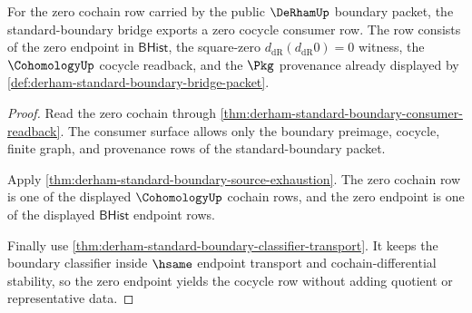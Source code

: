 \begin{theorem}
\label{thm:derham-standard-boundary-zero-cocycle-example}
For the zero cochain row carried by the public $\DeRhamUp$ boundary packet, the
standard-boundary bridge exports a zero cocycle consumer row. The row consists
of the zero endpoint in $\mathsf{BHist}$, the square-zero
$d_{\mathrm{dR}}(d_{\mathrm{dR}}0)=0$ witness, the $\CohomologyUp$ cocycle
readback, and the $\Pkg$ provenance already displayed by
\autoref{def:derham-standard-boundary-bridge-packet}.
\end{theorem}
\begin{proof}
Read the zero cochain through
\autoref{thm:derham-standard-boundary-consumer-readback}. The consumer surface
allows only the boundary preimage, cocycle, finite graph, and provenance rows of
the standard-boundary packet.

Apply \autoref{thm:derham-standard-boundary-source-exhaustion}. The zero
cochain row is one of the displayed $\CohomologyUp$ cochain rows, and the zero
endpoint is one of the displayed $\mathsf{BHist}$ endpoint rows.

Finally use \autoref{thm:derham-standard-boundary-classifier-transport}. It
keeps the boundary classifier inside $\hsame$ endpoint transport and
cochain-differential stability, so the zero endpoint yields the cocycle row
without adding quotient or representative data.
\end{proof}

